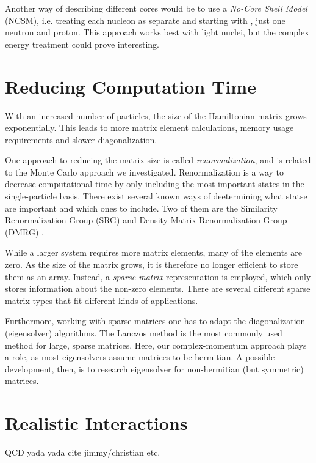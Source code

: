 \documentclass[../main/report.tex]{subfiles}
\begin{document}
Another way of describing different cores would be to use a \emph{No-Core Shell Model} (NCSM), i.e. treating each nucleon as separate and starting with , just one neutron and proton. This approach works best with light nuclei, but the complex energy treatment could prove interesting.

\section{Reducing Computation Time}

With an increased number of particles, the size of the Hamiltonian matrix grows exponentially. This leads to more matrix element calculations, memory usage requirements and slower diagonalization.

One approach to reducing the matrix size is called \emph{renormalization}, and is related to the Monte Carlo approach we investigated. 
Renormalization is a way to decrease computational time by only including the most important states in the single-particle basis.
There exist several known ways of deetermining what statse are important and which ones to include. Two of them are the Similarity Renormalization Group (SRG) and Density Matrix Renormalization Group (DMRG) \cite{DMRG}. 

While a larger system requires more matrix elements, many of the elements are zero. 
As the size of the matrix grows, it is therefore no longer efficient to store them as an array. 
Instead, a \emph{sparse-matrix} representation is employed, which only stores information about the non-zero elements. 
There are several different sparse matrix types that fit different kinds of applications. 

Furthermore, working with sparse matrices one has to adapt the diagonalization (eigensolver) algorithms. 
The Lanczos method is the most commonly used method for large, sparse matrices.
Here, our complex-momentum approach plays a role, as most eigensolvers assume matrices to be hermitian.
A possible development, then, is to research eigensolver for non-hermitian (but symmetric) matrices.

\section{Realistic Interactions}

QCD yada yada cite jimmy/christian etc.
\end{document}
